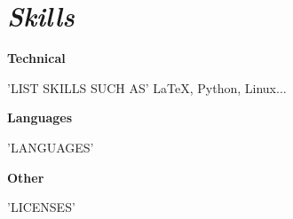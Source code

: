 \documentclass{memoir}
\begin{document}
\section{\textit{Skills}}  
\vspace{1mm}
\begin{adjustwidth}{0.5cm}{}
    \textbf{Technical}
    \begin{adjustwidth}{0.5cm}{}
        'LIST SKILLS SUCH AS' LaTeX, Python,  Linux...
    \end{adjustwidth}
    \textbf{Languages}
    \begin{adjustwidth}{0.5cm}{}
        'LANGUAGES'
    \end{adjustwidth}
    \textbf{Other}
    \begin{adjustwidth}{0.5cm}{}
        'LICENSES'
    \end{adjustwidth}
\end{adjustwidth}
\end{document}

